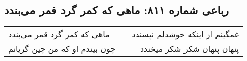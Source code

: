 \begin{center}
\section*{رباعی شماره ۸۱۱: ماهی که کمر گرد قمر می‌بندد}
\label{sec:0811}
\begin{longtable}{l p{0.5cm} r}
ماهی که کمر گرد قمر می‌بندد
&&
غمگینم از اینکه خوشدلم نپسندد
\\
چون بیندم او که من چین گریانم
&&
پنهان پنهان شکر شکر میخندد
\\
\end{longtable}
\end{center}
